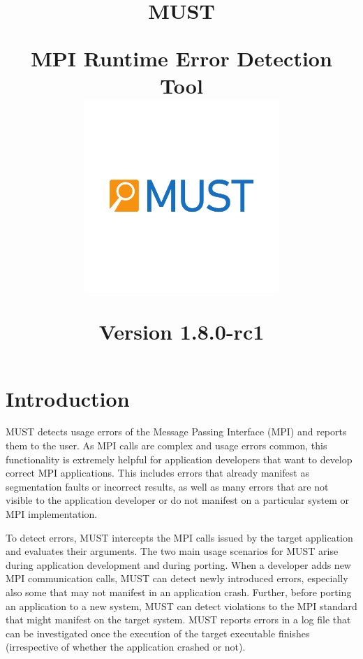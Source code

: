 \documentclass[english]{scrartcl}
\def \MUSTVersion {1.8.0-rc1}
\begin{document}
\title{\textsf{\textcolor{blue}{\Huge}}\\
\begin{center}
MUST
\end{center}
\textsf{\large MPI Runtime Error Detection Tool}\\
\vspace{8ex}
\centering\includegraphics[width=0.55\textwidth]{logo.pdf}
\begin{center}
\textsf{\normalfont \normalsize Version \MUSTVersion}\\
\end{center}
}
\maketitle

\newpage{}

\tableofcontents{}

\newpage{}

\section{Introduction}

MUST detects usage errors of the Message Passing Interface (MPI) and reports
them to the user.
As MPI calls are complex and usage errors common, this functionality is
extremely helpful for application developers that want to develop correct MPI applications.
This includes errors that already manifest as segmentation faults or incorrect
results, as well as many errors that are not visible to the application
developer or do not manifest on a particular system or MPI implementation. 

To detect errors, MUST intercepts the MPI calls issued by the target
application and evaluates their arguments. The two main usage
scenarios for MUST arise during application development and during porting.
When a developer adds new MPI communication calls, MUST can detect
newly introduced errors, especially also some that may not manifest in an
application crash. Further,
before porting an application to a new system, MUST can detect violations to the
MPI standard that might manifest on the target system. MUST reports errors
in a log file that can be investigated once the execution of the target
executable finishes (irrespective of whether the application crashed or not).
\end{document}
